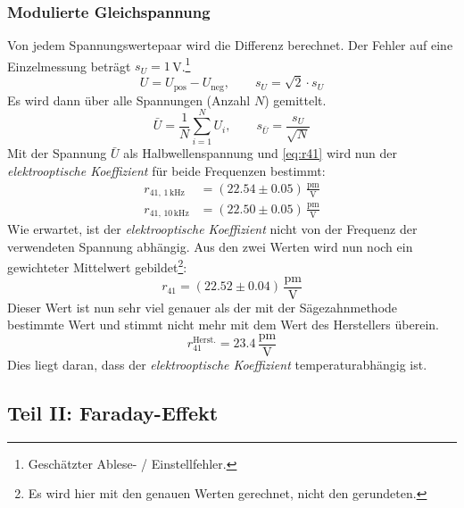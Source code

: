 \subsubsection{Modulierte Gleichspannung}
Von jedem Spannungswertepaar wird die Differenz berechnet. 
Der Fehler auf eine Einzelmessung beträgt $s_U = 1$\,V.\footnote{Geschätzter Ablese- / Einstellfehler.}
\begin{equation}
  U = U_{\text{pos}} - U_{\text{neg}}, \qquad s_U = \sqrt{2} \cdot s_U
\end{equation}
Es wird dann über alle Spannungen (Anzahl $N$) gemittelt.
\begin{equation}
  \bar{U} = \frac{1}{N} \sum_{i=1}^{N} U_i, \qquad s_{\bar{U}} = \frac{s_U}{\sqrt{N}}
\end{equation}
Mit der Spannung $\bar{U}$ als Halbwellenspannung und \autoref{eq:r41} wird nun der \emph{elektrooptische Koeffizient} für beide Frequenzen bestimmt:
\begin{equation}
  \begin{split}
    r_{41,\, 1\,\text{kHz}}  &= (22.54 \pm 0.05) \, \frac{\text{pm}}{\text{V}} \\
    r_{41,\, 10\,\text{kHz}} &= (22.50 \pm 0.05) \, \frac{\text{pm}}{\text{V}} 
  \end{split}
\end{equation}
Wie erwartet, ist der \emph{elektrooptische Koeffizient} nicht von der Frequenz der verwendeten Spannung abhängig. Aus den zwei Werten wird 
nun noch ein gewichteter Mittelwert gebildet\footnote{Es wird hier mit den genauen Werten gerechnet, nicht den gerundeten.}:
\begin{equation}
  r_{41} = (22.52 \pm 0.04) \, \frac{\text{pm}}{\text{V}}
\end{equation}
Dieser Wert ist nun sehr viel genauer als der mit der Sägezahnmethode bestimmte Wert und stimmt nicht mehr mit dem Wert des Herstellers überein.
\begin{equation}
  r_{41}^{\text{Herst.}} = 23.4 \, \frac{\text{pm}}{\text{V}}
\end{equation}
Dies liegt daran, dass der \emph{elektrooptische Koeffizient} temperaturabhängig ist.
\subsection{Teil II: Faraday-Effekt}
